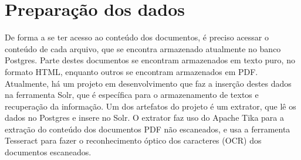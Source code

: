 %





\section{Preparação dos dados}%

De forma a se ter acesso ao conteúdo dos documentos, é preciso acessar o conteúdo de cada arquivo, que se encontra armazenado atualmente no banco Postgres. Parte destes documentos se encontram armazenados em texto puro, no formato HTML, enquanto outros se encontram armazenados em PDF. Atualmente, há um projeto em desenvolvimento que faz a inserção destes dados na ferramenta Solr, que é específica para o armazenamento de textos e recuperação da informação. Um dos artefatos do projeto é um extrator, que lê os dados no Postgres e insere no Solr. O extrator faz uso do Apache Tika para a extração do conteúdo dos documentos PDF não escaneados, e usa a ferramenta Tesseract para fazer o reconhecimento óptico dos caracteres (OCR) dos documentos escaneados. 



